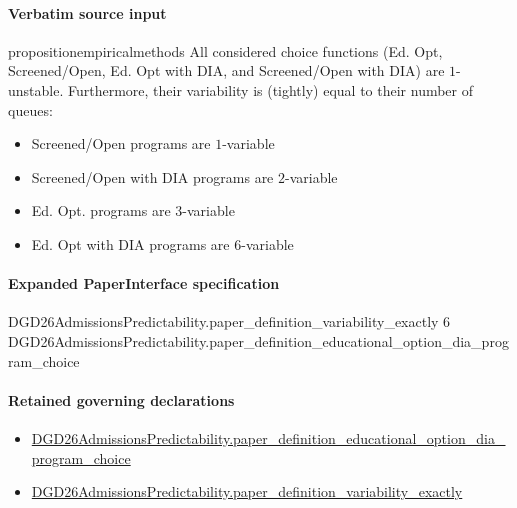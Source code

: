 \documentclass[10pt]{article}
\begin{document}
\paragraph{Verbatim source input}
\begin{ReviewVerbatim}
\begin{restatable}[]{proposition}{empiricalmethods}
\label{prop:program-variability}
All considered choice functions ({Ed. Opt}, {Screened/Open}, {Ed. Opt with DIA}, and {Screened/Open with DIA}) are $1$-unstable. Furthermore, their variability is (tightly) equal to their number of queues:

\begin{itemize}[noitemsep,topsep=0pt,parsep=0pt,partopsep=0pt]
    \item Screened/Open programs are $1$-variable
    \item Screened/Open with DIA programs are $2$-variable
    \item Ed. Opt. programs are $3$-variable
    \item Ed. Opt with DIA programs are $6$-variable
\end{itemize}

\end{restatable}
\end{ReviewVerbatim}



\paragraph{Expanded PaperInterface specification}
\begin{ReviewVerbatim}
DGD26AdmissionsPredictability.paper_definition_variability_exactly 6
  DGD26AdmissionsPredictability.paper_definition_educational_option_dia_program_choice
\end{ReviewVerbatim}

\paragraph{Retained governing declarations}
\begin{itemize}\raggedright
\item \hyperlink{governing-declaration-9292267e580ba2d6}{DGD26\allowbreak{}Admissions\allowbreak{}Predictability.\allowbreak{}paper\_\allowbreak{}definition\_\allowbreak{}educational\_\allowbreak{}option\_\allowbreak{}dia\_\allowbreak{}program\_\allowbreak{}choice}
\item \hyperlink{governing-declaration-ce6697be3f1c2256}{DGD26\allowbreak{}Admissions\allowbreak{}Predictability.\allowbreak{}paper\_\allowbreak{}definition\_\allowbreak{}variability\_\allowbreak{}exactly}
\end{itemize}
\end{document}
